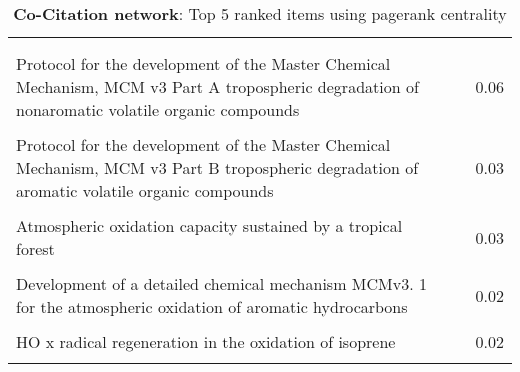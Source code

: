 \begin{table}[H]
     \begin{tabular}{p{}p{}c}
     \toprule
      & & \\\\
     Protocol for the development of the Master Chemical Mechanism, MCM v3 Part A tropospheric degradation of nonaromatic volatile organic compounds & \cite{pagerank0} & 0.06  \\ \\
        Protocol for the development of the Master Chemical Mechanism, MCM v3 Part B tropospheric degradation of aromatic volatile organic compounds & \cite{pagerank1} & 0.03  \\ \\
        Atmospheric oxidation capacity sustained by a tropical forest & \cite{pagerank2} & 0.03  \\ \\
        Development of a detailed chemical mechanism MCMv3. 1 for the atmospheric oxidation of aromatic hydrocarbons & \cite{pagerank3} & 0.02  \\ \\
        HO x radical regeneration in the oxidation of isoprene & \cite{pagerank4} & 0.02  \\ \\
        \bottomrule
    \end{tabular}
    \label{tab:pagerank_Co-Citation}
    \caption{\textbf{Co-Citation network}: Top 5 ranked items using pagerank centrality}
    \end{table}

    